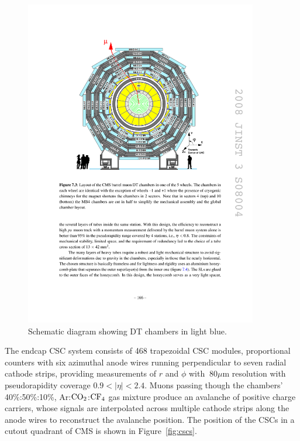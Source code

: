 \begin{figure}[tbh]
\centering
\includegraphics[width=4in]{figures/DTs.pdf}
\caption{Schematic diagram showing DT chambers in light blue.}
\label{fig:DTs}
\end{figure}

\indent The endcap CSC system consists of 468 trapezoidal CSC modules, proportional counters with six azimuthal anode wires running perpendicular to seven radial cathode strips, providing measurements of $r$ and $\phi$ with $~80 \mu$m resolution with pseudorapidity coverage $0.9 < |\eta| < 2.4$. Muons passing though the chambers' 40\%:50\%:10\%, Ar:$\rm{CO}_2$:$\rm{CF}_4$ gas mixture produce an avalanche of positive charge carriers, whose signals are interpolated across multiple cathode strips along the anode wires to reconstruct the avalanche position. The position of the CSCs in a cutout quadrant of CMS is shown in Figure~\ref{fig:cscs}.

